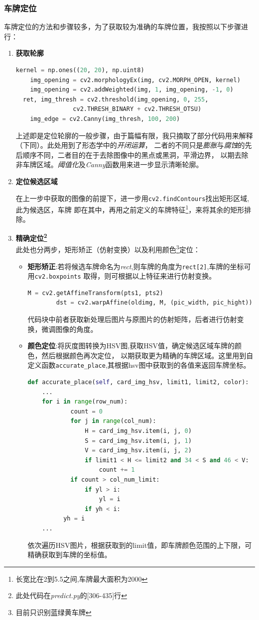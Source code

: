 \documentclass[UTF8,10pt,titlepage,a4paper]{ctexart}
\begin{document}
\subsubsection{车牌定位}
车牌定位的方法和步骤较多，为了获取较为准确的车牌位置，我按照以下步骤进行：
\begin{enumerate}
  \item \textbf{获取轮廓} \par
  \begin{lstlisting}[language=python]
  kernel = np.ones((20, 20), np.uint8)
	img_opening = cv2.morphologyEx(img, cv2.MORPH_OPEN, kernel)
	img_opening = cv2.addWeighted(img, 1, img_opening, -1, 0)
  ret, img_thresh = cv2.threshold(img_opening, 0, 255,
                cv2.THRESH_BINARY + cv2.THRESH_OTSU)
	img_edge = cv2.Canny(img_thresh, 100, 200)
  \end{lstlisting} 
  上述即是定位轮廓的一般步骤，由于篇幅有限，我只摘取了部分代码用来解释（下同）。此处用到了形态学中的\emph{开闭运算}，
  二者的不同只是\emph{膨胀}与\emph{腐蚀}的先后顺序不同，二者目的在于去除图像中的黑点或黑洞，平滑边界，
  以期去除非车牌区域。\emph{阈值化}及\emph{Canny}函数用来进一步显示清晰轮廓。
  \item \textbf{定位候选区域} \par
  在上一步中获取的图像的前提下，进一步用\verb|cv2.findContours|找出矩形区域,此为候选区，车牌
  即在其中，再用之前定义的车牌特征\footnote{长宽比在2到5.5之间,车牌最大面积为2000}，来将其余的矩形排除。
  \item \textbf{精确定位\footnote{此处代码在\emph{predict.py}的[306-435]行}}\\
  此处也分两步，矩形矫正（仿射变换）以及利用颜色\footnote{目前只识别蓝绿黄车牌}定位：
  \begin{itemize}
    \item \textbf{矩形矫正}:若将候选车牌命名为\emph{rect},则车牌的角度为\verb|rect[2]|,车牌的坐标可用\verb|cv2.boxpoints|
    取得，则可根据以上特征来进行仿射变换。
    \begin{lstlisting}[language=python]
    M = cv2.getAffineTransform(pts1, pts2)
		dst = cv2.warpAffine(oldimg, M, (pic_width, pic_hight))
    \end{lstlisting} 
    代码块中前者获取新处理后图片与原图片的仿射矩阵，后者进行仿射变换，微调图像的角度。
    \item \textbf{颜色定位}:将灰度图转换为HSV图,获取HSV值，确定候选区域车牌的颜色，然后根据颜色再次定位，
    以期获取更为精确的车牌区域。这里用到自定义函数\verb|accurate_place|,其根据hsv图中获取到的各值来返回车牌坐标。
    \begin{lstlisting}[language=python]
def accurate_place(self, card_img_hsv, limit1, limit2, color):
    ...
    for i in range(row_num):
			count = 0
			for j in range(col_num):
				H = card_img_hsv.item(i, j, 0)
				S = card_img_hsv.item(i, j, 1)
				V = card_img_hsv.item(i, j, 2)
				if limit1 < H <= limit2 and 34 < S and 46 < V:
					count += 1
			if count > col_num_limit:
				if yl > i:
					yl = i
				if yh < i:
          yh = i
    ...
    \end{lstlisting} 
    依次遍历HSV图片，根据获取到的limit值，即车牌颜色范围的上下限，可精确获取到车牌的坐标值。
  \end{itemize}
\end{enumerate}
\end{document}
